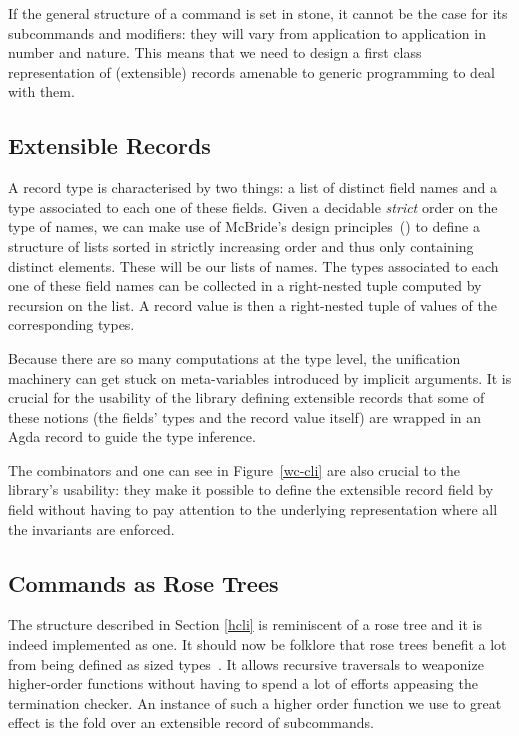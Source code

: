 \documentclass[preprint,9pt]{sigplanconf}
\begin{document}
If the general structure of a command is set in stone, it cannot
be the case for its subcommands and modifiers: they will vary
from application to application in number and nature. This means
that we need to design a first class representation of (extensible)
records amenable to generic programming to deal with them.

\subsection{Extensible Records}

A record type is characterised by two things: a list of distinct
field names and a type associated to each one of these fields.
Given a decidable \emph{strict} order on the type of names, we can
make use of McBride's design principles~(\citeyear{mcbride2014keep})
to define a structure of lists sorted in strictly increasing order
and thus only containing distinct elements. These will be our lists
of names. The types associated to each one of these field names can
be collected in a right-nested tuple computed by recursion on the list.
A record value is then a right-nested tuple of values of the corresponding
types.

Because there are so many computations at the type level, the
unification machinery can get stuck on meta-variables introduced
by implicit arguments. It is crucial for the usability of the
library defining extensible records that some of these notions
(the fields' types and the record value itself) are wrapped in
an Agda record to guide the type inference.

The combinators  and  one can see in
Figure~\ref{wc-cli} are also crucial to the library's usability:
they make it possible to define the extensible record field by
field without having to pay attention to the underlying representation
where all the invariants are enforced.


\subsection{Commands as Rose Trees}

The structure described in Section \ref{hcli} is reminiscent of a
rose tree and it is indeed implemented as one. It should now be
folklore that rose trees benefit a lot from being defined as sized
types~\cite{abelminiagda}. It allows recursive traversals to weaponize
higher-order functions without having to spend a lot of efforts
appeasing the termination checker. An instance of such a higher order
function we use to great effect is the fold over an extensible record
of subcommands.
\end{document}

